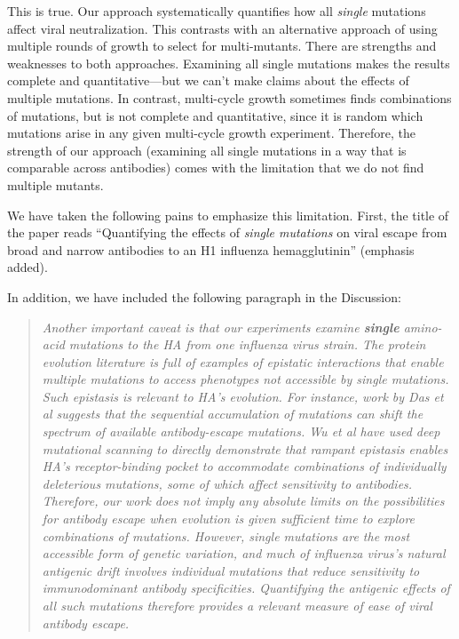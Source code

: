 \documentclass[11pt, oneside]{article}   	%
\begin{document}
{\color{black}
This is true.
Our approach systematically quantifies how all \emph{single} mutations affect viral neutralization.
This contrasts with an alternative approach of using multiple rounds of growth to select for multi-mutants.
There are strengths and weaknesses to both approaches.
Examining all single mutations makes the results complete and quantitative---but we can't make claims about the effects of multiple mutations.
In contrast, multi-cycle growth sometimes finds combinations of mutations, but is not complete and quantitative, since it is random which mutations arise in any given multi-cycle growth experiment.
Therefore, the strength of our approach (examining all single mutations in a way that is comparable across antibodies) comes with the limitation that we do not find multiple mutants.

We have taken the following pains to emphasize this limitation. 
First, the title of the paper reads ``Quantifying the effects of \emph{single mutations} on viral escape from broad and narrow antibodies to an H1 influenza hemagglutinin'' (emphasis added). 

In addition, we have included the following paragraph in the Discussion:

\begin{quote}
\textsl{Another important caveat is that our experiments examine {\bf single} amino-acid mutations to the HA from one influenza virus strain.
The protein evolution literature is full of examples of epistatic interactions that enable multiple mutations to access phenotypes not accessible by single mutations.
Such epistasis is relevant to HA's evolution.  
For instance, work by Das et al suggests that the sequential accumulation of mutations can shift the spectrum of available antibody-escape mutations.
Wu et al have used deep mutational scanning to directly demonstrate that rampant epistasis enables HA's receptor-binding pocket to accommodate combinations of individually deleterious mutations, some of which affect sensitivity to antibodies.
Therefore, our work does not imply any absolute limits on the possibilities for antibody escape when evolution is given sufficient time to explore combinations of mutations.
However, single mutations are the most accessible form of genetic variation, and much of influenza virus's natural antigenic drift involves individual mutations that reduce sensitivity to immunodominant antibody specificities.
Quantifying the antigenic effects of all such mutations therefore provides a relevant measure of ease of viral antibody escape. }
\end{quote}
}
\end{document}

